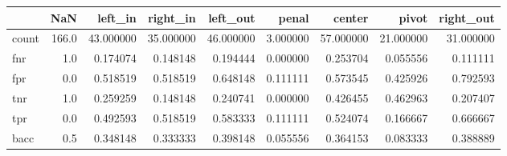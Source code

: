 \begin{tabular}{lrrrrrrrr}
\toprule
{} &    NaN &    left\_in &   right\_in &   left\_out &     penal &     center &      pivot &  right\_out \\
\midrule
count &  166.0 &  43.000000 &  35.000000 &  46.000000 &  3.000000 &  57.000000 &  21.000000 &  31.000000 \\
fnr   &    1.0 &   0.174074 &   0.148148 &   0.194444 &  0.000000 &   0.253704 &   0.055556 &   0.111111 \\
fpr   &    0.0 &   0.518519 &   0.518519 &   0.648148 &  0.111111 &   0.573545 &   0.425926 &   0.792593 \\
tnr   &    1.0 &   0.259259 &   0.148148 &   0.240741 &  0.000000 &   0.426455 &   0.462963 &   0.207407 \\
tpr   &    0.0 &   0.492593 &   0.518519 &   0.583333 &  0.111111 &   0.524074 &   0.166667 &   0.666667 \\
bacc  &    0.5 &   0.348148 &   0.333333 &   0.398148 &  0.055556 &   0.364153 &   0.083333 &   0.388889 \\
\bottomrule
\end{tabular}
